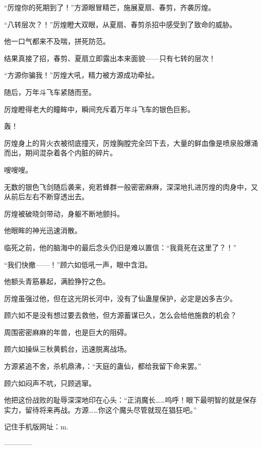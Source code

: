 \begin{this_body}
“厉煌你的死期到了！”方源眼冒精芒，施展夏扇、春剪，齐袭厉煌。

“八转层次？！”厉煌瞪大双眼，从夏扇、春剪杀招中感受到了致命的威胁。

他一口气都来不及喘，拼死防范。

结果真接了招，春剪、夏扇立即露出本来面貌——只有七转的层次！

“方源你骗我！”厉煌大吼，精力被方源成功牵扯。

随后，万年斗飞车紧随而至。

厉煌瞪得老大的瞳眸中，瞬间充斥着万年斗飞车的银色巨影。

轰！

厉煌身上的背火衣被彻底撞灭，厉煌胸膛完全凹下去，大量的鲜血像是喷泉般爆涌而出，期间混杂着各个内脏的碎片。

嗖嗖嗖。

无数的银色飞剑随后袭来，宛若蜂群一般密密麻麻，深深地扎进厉煌的肉身中，又从前后左右不断穿透出去。

厉煌被破晓剑带动，身躯不断地颤抖。

他眼眸的神光迅速消散。

临死之前，他的脑海中的最后念头仍旧是难以置信：“我竟死在这里了？！”

“我们快撤——！”顾六如低吼一声，眼中含泪。

他额头青筋暴起，满脸狰狞之色。

厉煌虽强过他，但在这光阴长河中，没有了仙蛊屋保护，必定是凶多吉少。

顾六如不是没有想过要去救他，但方源蓄谋已久，怎么会给他施救的机会？

周围密密麻麻的年兽，也是巨大的阻碍。

顾六如操纵三秋黄鹤台，迅速脱离战场。

方源紧追不舍，杀机鼎沸，：“天庭的蛊仙，都给我留下命来罢。”

顾六如闷声不吭，只顾逃窜。

他把这份战败的耻辱深深地印在心头：“正消魔长……呜呼！眼下最明智的就是保存实力，留待将来再战。方源……你这个魔头尽管就现在猖狂吧。”

记住手机版网址：m.

------------

\end{this_body}

